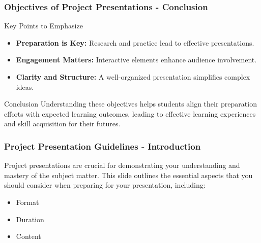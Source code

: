 \documentclass[aspectratio=169]{beamer}
\begin{document}
\begin{frame}[fragile]
    \frametitle{Objectives of Project Presentations - Conclusion}
    \begin{block}{Key Points to Emphasize}
        \begin{itemize}
            \item \textbf{Preparation is Key:} Research and practice lead to effective presentations.
            \item \textbf{Engagement Matters:} Interactive elements enhance audience involvement.
            \item \textbf{Clarity and Structure:} A well-organized presentation simplifies complex ideas.
        \end{itemize}
    \end{block}
    
    \begin{block}{Conclusion}
        Understanding these objectives helps students align their preparation efforts with expected learning outcomes, leading to effective learning experiences and skill acquisition for their futures.
    \end{block}
\end{frame}

\begin{frame}[fragile]
    \frametitle{Project Presentation Guidelines - Introduction}
    Project presentations are crucial for demonstrating your understanding and mastery of the subject matter. This slide outlines the essential aspects that you should consider when preparing for your presentation, including:
    \begin{itemize}
        \item Format
        \item Duration
        \item Content
    \end{itemize}
\end{frame}
\end{document}
